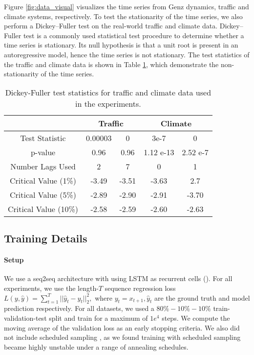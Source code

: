 Figure \ref{fig:data_visual} visualizes the time series from Genz dynamics, traffic and climate systems, respectively.  To test the stationarity of the time series, we also perform a Dickey–Fuller test on the real-world traffic and climate data. Dickey–Fuller  test is a commonly used statistical test procedure  to determine whether a time series is stationary. Its null hypothesis is that  a unit root is present in an autoregressive model, hence the time series  is not stationary.  The test statistics of the traffic and climate data is shown in Table \ref{app:tb:adf}, which demonstrate the non-stationarity of the time series.
\begin{table}[hb]
    \begin{center}
        \begin{tabular}{c |  cc | cc }
        \hline
           & \multicolumn{2}{c}{\bf Traffic } & \multicolumn{2}{c}{\bf   Climate } \\ 
           \hline
    Test Statistic      & 0.00003 & 0   & 3e-7 & 0  \\
p-value        &     0.96& 0.96  &     1.12 e-13 & 2.52 e-7  \\
Number Lags Used  &     2 & 7  &  0 & 1 \\
Critical Value (1\%)     &   -3.49& -3.51     &   -3.63& 2.7     \\
Critical Value (5\%)  & -2.89& -2.90   & -2.91& -3.70\\
Critical Value (10\%)       & -2.58 & -2.59   & -2.60 & -2.63\\
\hline
        \end{tabular}
    \caption{ Dickey-Fuller test  statistics for traffic and climate data used in the experiments. }
	\label{app:tb:adf}
    \end{center}
\vspace{-5mm}
\end{table}


\subsection{Training Details}

\paragraph{Setup}
%
We use a seq2seq architecture with \trnn{} using LSTM as recurrent cells (\tlstm{}).
%
For all experiments, we use the length-$T$ sequence regression loss
%
$L(y,\hat{y}) = \sum_{t=1}^T ||\hat{y}_t-y_t||^2_2,$
%
where $y_t = x_{t+1}, \hat{y}_t$ are the ground truth and model prediction respectively.  For all datasets, we used a $80\%-10\%-10\%$ train-validation-test split and train for a maximum of $1e^4$ steps. We compute the moving average of  the validation loss as an early stopping criteria. We also did not include scheduled sampling \cite{bengio2015scheduled}, as we found training with scheduled sampling became highly unstable under a range of annealing schedules.

